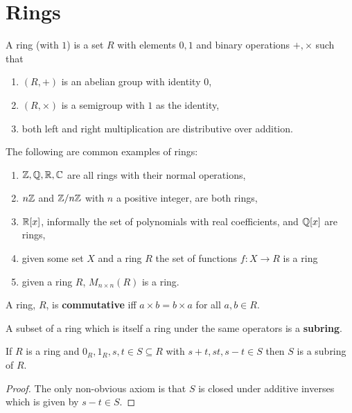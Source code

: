 \documentclass{report}
\begin{document}
\renewcommand*\thesection{\arabic{section}}

\tableofcontents\pagebreak

\section{Rings}

\begin{definition}[Ring]
    A ring (with $1$) is a set $R$ with elements $0,1$ and binary operations $+,\times$ such that \begin{enumerate}
        \item $(R,+)$ is an abelian group with identity $0$,
        \item $(R,\times)$ is a semigroup with $1$ as the identity,
        \item both left and right multiplication are distributive over addition.
    \end{enumerate}
\end{definition}

\begin{examples}
    The following are common examples of rings:
    \begin{enumerate}
        \item  $\mathbb{Z},\mathbb{Q},\mathbb{R},\mathbb{C}$ are all rings with their normal operations,
        \item $n\mathbb{Z}$ and $\mathbb{Z}/n\mathbb{Z}$ with $n$ a positive integer, are both rings,
        \item $\mathbb{R}[x]$, informally the set of polynomials with real coefficients, and $\mathbb{Q}[x]$ are rings,
        \item given some set $X$ and a ring $R$ the set of functions $f:X\rightarrow R$ is a ring
        \item given a ring $R$, $M_{n\times n}(R)$ is a ring.
    \end{enumerate}
\end{examples}

\begin{definition}
    A ring, $R$, is \textbf{commutative} iff $a\times b=b\times a$ for all $a,b\in R$.
\end{definition}

\begin{definition}[Subring]
    A subset of a ring which is itself a ring under the same operators is a \textbf{subring}.
\end{definition}

\begin{lemma}\label{subring test}
    If $R$ is a ring and $0_R,1_R,s,t\in S\subseteq R$ with $s+t,st,s-t\in S$ then $S$ is a subring of $R$.
    \begin{proof}
        The only non-obvious axiom is that $S$ is closed under additive inverses which is given by $s-t\in S$.
    \end{proof}
\end{lemma}
\end{document}
